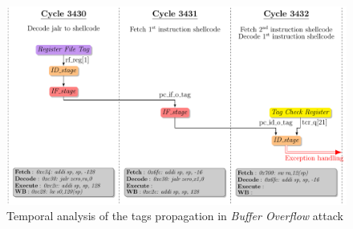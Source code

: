 \begin{frame}
    \begin{figure}
        \centering
        \includegraphics[width=.75\textwidth]{src/2_vuln_assessment/img/buffer_overflow/bufferOverflowAttack_short.pdf}
        \caption{Temporal analysis of the tags propagation in \textit{Buffer Overflow} attack}
        \label{fig:analyseTempoBufferOverflow}
    \end{figure}
\end{frame}

